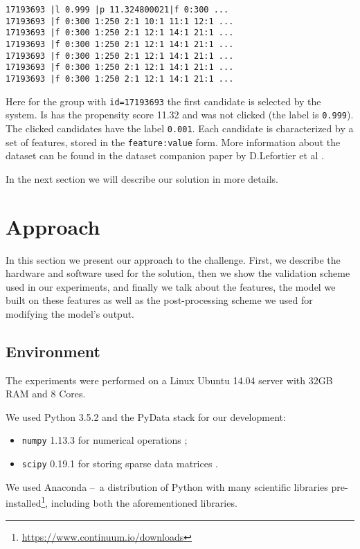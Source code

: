 \documentclass{sig-alternate}
\begin{document}
\begin{verbatim}
17193693 |l 0.999 |p 11.324800021|f 0:300 ...
17193693 |f 0:300 1:250 2:1 10:1 11:1 12:1 ...
17193693 |f 0:300 1:250 2:1 12:1 14:1 21:1 ... 
17193693 |f 0:300 1:250 2:1 12:1 14:1 21:1 ... 
17193693 |f 0:300 1:250 2:1 12:1 14:1 21:1 ... 
17193693 |f 0:300 1:250 2:1 12:1 14:1 21:1 ... 
17193693 |f 0:300 1:250 2:1 12:1 14:1 21:1 ... 
\end{verbatim}

Here for the group with \verb|id=17193693| the first candidate is 
selected by the system. Is has the propensity score 11.32 and was not clicked
(the label is \verb|0.999|). The clicked candidates have the label \verb|0.001|.
Each candidate is characterized by a set of features, stored 
in the \verb|feature:value| form.
More information about the dataset can be found in the dataset companion
paper by D.Lefortier et al \cite{lefortier2016large}.

In the next section we will describe our solution in more details.


\section{Approach}

In this section we present our approach to the challenge.
First, we describe the hardware and software used for the solution,
then we show the validation scheme used in our experiments,
and finally we talk about the features, the model we built on these features
as well as the post-processing scheme we used for modifying the model's output.


\subsection{Environment}

The experiments were performed on a Linux Ubuntu 14.04 server with 32GB RAM and 8 Cores.

We used Python 3.5.2 and the PyData stack for our development:

\begin{itemize}
  \item \texttt{numpy} 1.13.3 for numerical operations \cite{van2011numpy};
  \item \texttt{scipy} 0.19.1 for storing sparse data matrices \cite{jones2015scipy}.
\end{itemize}

We used Anaconda --~a distribution of Python with many
scientific libraries pre-installed\footnote{\url{https://www.continuum.io/downloads}},
including both the aforementioned libraries.
\end{document}
